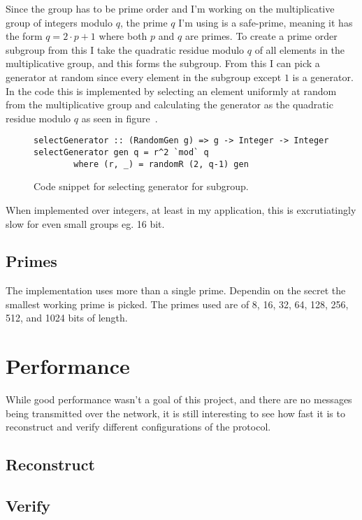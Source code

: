 \documentclass[a4paper,oneside,12pt,final]{article}
\begin{document}
Since the group has to be prime order and I'm working on the multiplicative
group of integers modulo $q$, the prime $q$ I'm using is a safe-prime, meaning
it has the form $q = 2 \cdot p + 1$ where both $p$ and $q$ are primes. To create
a prime order subgroup from this I take the quadratic residue modulo $q$ of all
elements in the multiplicative group, and this forms the subgroup. From this I
can pick a generator at random since every element in the subgroup except $1$ is
a generator. In the code this is implemented by selecting an element uniformly
at random from the multiplicative group and calculating the generator as the
quadratic residue modulo $q$ as seen in figure~\pageref{fig:select-generator}.

\begin{figure}[h]
\label{fig:select-generator}
\begin{verbatim}
selectGenerator :: (RandomGen g) => g -> Integer -> Integer
selectGenerator gen q = r^2 `mod` q
        where (r, _) = randomR (2, q-1) gen
\end{verbatim}
\caption{Code snippet for selecting generator for subgroup.}
\end{figure}




When implemented over integers, at least in my application, this is
excrutiatingly slow for even small groups eg. 16 bit. 

\subsection{Primes}

The implementation uses more than a single prime. Dependin on the secret the
smallest working prime is picked. The primes used are of 8, 16, 32, 64, 128,
256, 512, and 1024 bits of length.

\section{Performance}

While good performance wasn't a goal of this project, and there are no messages
being transmitted over the network, it is still interesting to see how fast it
is to reconstruct and verify different configurations of the protocol.

\subsection{Reconstruct}


\subsection{Verify}

\end{document}
